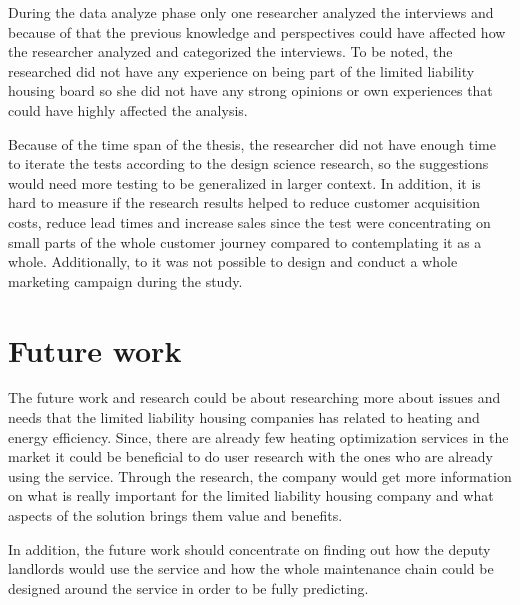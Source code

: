 During the data analyze phase only one researcher analyzed the interviews and because of that the previous knowledge and perspectives could have affected how the researcher analyzed and categorized the interviews. To be noted, the researched did not have any experience on being part of the limited liability housing board so she did not have any strong opinions or own experiences that could have highly affected the analysis.

Because of the time span of the thesis, the researcher did not have enough time to iterate the tests according to the design science research, so the suggestions would need more testing to be generalized in larger context. In addition, it is hard to measure if the research results helped to reduce customer acquisition costs, reduce lead times and increase sales since the test were concentrating on small parts of the whole customer journey compared to contemplating it as a whole. Additionally, to it was not possible to design and conduct a whole marketing campaign during the study.

\section{Future work}

The future work and research could be about researching more about issues and needs that the limited liability housing companies has related to heating and energy efficiency. Since, there are already few heating optimization services in the market it could be beneficial to do user research with the ones who are already using the service. Through the research, the company would get more information on what is really important for the limited liability housing company and what aspects of the solution brings them value and benefits.

In addition, the future work should concentrate on finding out how the deputy landlords would use the service and how the whole maintenance chain could be designed around the service in order to be fully predicting.